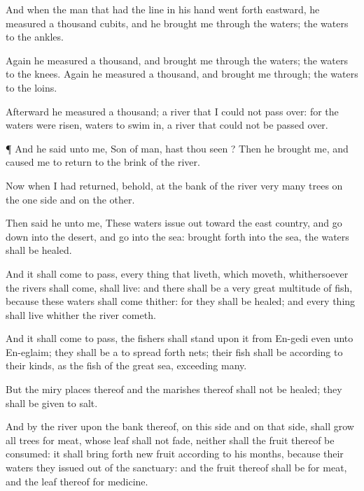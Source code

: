 {And when the
man that had the
line in his
hand went
forth
eastward, he
measured a
thousand
cubits, and he brought me
through the
waters; the
waters
{} to the
ankles.

Again he
measured a
thousand, and brought me
through the
waters; the
waters
{} to the
knees. Again he
measured a
thousand, and brought me
through; the
waters
{} to the
loins.

Afterward he
measured a
thousand;
{} a
river that I
could not pass
over: for the
waters were
risen,
waters to swim
in, a
river that could not be passed
over.


\par }{\PP {}¶ And he
said unto me,
Son of
man, hast thou
seen
{}? Then he
brought me, and caused me to
return to the
brink of the
river.

Now when I had
returned, behold, at the
bank of the
river
{}
very
many
trees on the one side and on the other.

Then
said he unto me, These
waters issue
out toward the
east
country, and go
down into the
desert, and
go into the
sea:
{} brought
forth into the
sea, the
waters shall be
healed.

And it shall come to pass,
{} every
thing that
liveth, which
moveth, whithersoever the
rivers shall
come, shall
live: and there shall be a
very
great multitude of
fish, because these
waters shall
come thither: for they shall be
healed; and every thing shall
live whither the
river
cometh.

And it shall come to pass,
{} the
fishers shall
stand upon it from
En-gedi even unto
En-eglaim; they shall be a
{} to spread
forth
nets; their
fish shall be according to their
kinds, as the
fish of the
great
sea,
exceeding
many.

But the miry
places thereof and the
marishes thereof shall not be
healed; they shall be
given to
salt.

And by the
river upon the
bank thereof, on this side and on that side, shall
grow all
trees for
meat, whose
leaf shall not
fade, neither shall the
fruit thereof be
consumed: it shall bring forth new
fruit according to his
months, because their
waters they issued
out of the
sanctuary: and the
fruit thereof shall be for
meat, and the
leaf thereof for
medicine.


}
